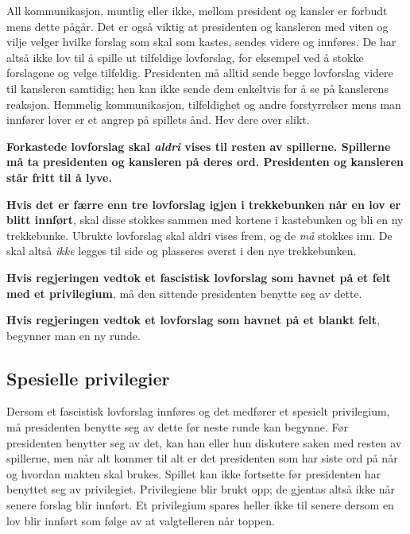 \documentclass[a4paper, 10pt, twocolumn, twoside]{article}
\begin{document}
All kommunikasjon, muntlig eller ikke, mellom president og kansler er forbudt mens dette pågår. Det er også viktig at presidenten og kansleren med viten og vilje velger hvilke forslag som skal som kastes, sendes videre og innføres. De har altså ikke lov til å spille ut tilfeldige lovforslag, for eksempel ved å stokke forslagene og velge tilfeldig. Presidenten må alltid sende begge lovforslag videre til kansleren samtidig; hen kan ikke sende dem enkeltvis for å se på kanslerens reaksjon. Hemmelig kommunikasjon, tilfeldighet og andre forstyrrelser mens man innfører lover er et angrep på spillets ånd. Hev dere over slikt.

\textbf{Forkastede lovforslag skal \textit{aldri} vises til resten av spillerne. Spillerne må ta presidenten og kansleren på deres ord. Presidenten og kansleren står fritt til å lyve.
}

{\color{naziorange}

}

\textbf{Hvis det er færre enn tre lovforslag igjen i trekkebunken når en lov er blitt innført}, skal disse stokkes sammen med kortene i kastebunken og bli en ny trekkebunke. Ubrukte lovforslag skal aldri vises frem, og de \textit{må} stokkes inn. De skal altså \textit{ikke} legges til side og plasseres øverst i den nye trekkebunken.

\textbf{Hvis regjeringen vedtok et fascistisk lovforslag som havnet på et felt med et privilegium}, må den sittende presidenten benytte seg av dette. 

\textbf{Hvis regjeringen vedtok et lovforslag som havnet på et blankt felt}, begynner man en ny runde.

\subsection{Spesielle privilegier}
Dersom et fascistisk lovforslag innføres og det medfører et spesielt privilegium, må presidenten benytte seg av dette før neste runde kan begynne. Før presidenten benytter seg av det, kan han eller hun diskutere saken med resten av spillerne, men når alt kommer til alt er det presidenten som har siste ord på når og hvordan makten skal brukes. Spillet kan ikke fortsette før presidenten har benyttet seg av privilegiet. Privilegiene blir brukt opp; de gjentas altså ikke når senere forslag blir innført. Et privilegium spares heller ikke til senere dersom en lov blir innført som følge av at valgtelleren når toppen. 
\end{document}
